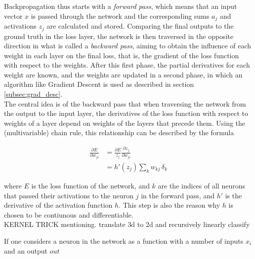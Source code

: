 Backpropagation thus starts with a \textit{forward pass}, which means that an input vector $x$ is passed through the network and the corresponding sums $a_j$ and activations $z_j$ are calculated and stored. Comparing the final outputs to the ground truth in the loss layer, the network is then traversed in the opposite direction in what is called a \textit{backward pass}, aiming to obtain the influence of each weight in each layer on the final loss, that is, the gradient of the loss function with respect to the weights. After this first phase, the partial derivatives for each weight are known, and the weights are updated in a second phase, in which an algorithm like Gradient Descent is used as described in section \ref{subsec:grad_desc}.\\

\noindent The central idea is of the backward pass that when traversing the network from the output to the input layer, the derivatives of the loss function with respect to weights of a layer depend on weights of the layers that precede them. Using the (multivariable) chain rule, this relationship can be described by the formula

\begin {align}
	\frac{\partial E}{\partial w_{ji}} &= \frac{\partial E}{z_j} \frac{\partial z_j}{\partial w_{ji}} \\
	&= h'(z_j) \sum \limits_{k} w_{kj} \, \delta_k
\end {align}

\noindent where $E$ is the loss function of the network, and $k$ are the indices of all neurons that passed their activations to the neuron $j$ in the forward pass, and $h'$ is the derivative of the activation function $h$. This step is also the reason why $h$ is chosen to be contiunous and differentiable.\\



KERNEL TRICK mentioning. translate 3d to 2d and recursively linearly classify


\noindent If one considers a neuron in the network as a function with a number of inputs $x_i$ and an output $out$



